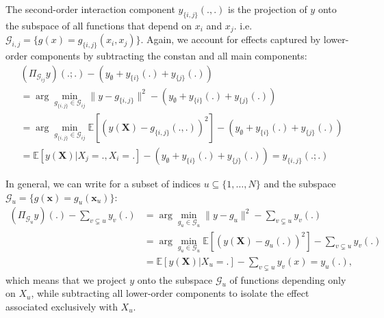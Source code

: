 The second-order interaction component $y_{\{i,j\}}(.,.)$ is the projection of $y$ onto the subspace of all functions that depend on $x_i$ and $x_j$. i.e. $\mathcal{G}_{i,j} = \{g(x) = g_{\{i,j\}}(x_i, x_j)\}$. Again, we account for effects captured by lower-order components by subtracting the constan and all main components:
\begin{align*}
    &(\Pi_{\mathcal{G}_{ij}}y)(.;.) - (y_{\emptyset} + y_{\{i\}}(.) + y_{\{j\}}(.)) \\
    &= \arg \min_{g_{\{i,j\}} \in \mathcal{G}_{ij}} \|y - g_{\{i,j\}}\|^2 - (y_{\emptyset} + y_{\{i\}}(.) + y_{\{j\}}(.))\\
    &= \arg \min_{g_{\{i,j\}} \in \mathcal{G}_{ij}} \mathbb{E}[(y(\boldsymbol{X}) - g_{\{i,j\}}(., .))^2] - (y_{\emptyset} + y_{\{i\}}(.) + y_{\{j\}}(.))\\
    &= \mathbb{E}[y(\boldsymbol{X}) | X_j = ., X_i = .] - (y_{\emptyset} + y_{\{i\}}(.) + y_{\{j\}}(.)) = y_{\{i,j\}}(.;.)
\end{align*}

In general, we can write for a subset of indices $u \subseteq \{1, \dots, N\}$ and the subspace $\mathcal{G}_u = \{g(\boldsymbol{x}) = g_u(\boldsymbol{x}_u)\}$:
\begin{align*}
    (\Pi_{\mathcal{G}_u}y)(.) - \sum_{v \subsetneq u} y_v(.)
    &= \arg \min_{g_u \in \mathcal{G}_u} \|y - g_u\|^2 - \sum_{v \subsetneq u} y_v(.)\\
    &= \arg \min_{g_u \in \mathcal{G}_{u}} \mathbb{E}[(y(\boldsymbol{X}) - g_u(.))^2] - \sum_{v \subsetneq u} y_v(.)\\
    &= \mathbb{E}[y(\boldsymbol{X}) | X_{u} = .] - \sum_{v \subsetneq u} y_v(x) = y_u(.),
\end{align*}
which means that we project $y$ onto the subspace $\mathcal{G}_u$ of functions depending only on $X_u$, while subtracting all lower-order components to isolate the effect associated exclusively with $X_u$.\par

